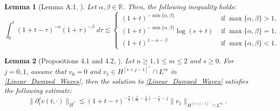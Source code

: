 \documentclass[11pt,reqno]{amsart}
\newtheorem{lemma}{Lemma}[section]
\begin{document}
\begin{lemma}[Lemma A.1, \cite{Dao2019}] \label{prop_Integral inequality}
Let $\alpha, \beta \in \mathbb{R}$. Then, the following inequality holds:
$$
\int_{0}^{t}(1+t-\tau)^{-\alpha}(1+\tau)^{-\beta} \; d \tau \lesssim \begin{cases}(1+t)^{-\min \{\alpha, \beta\}} & \text { if } \max \{\alpha, \beta\}>1, \\ (1+t)^{-\min \{\alpha, \beta\}} \log (e+t) & \text { if } \max \{\alpha, \beta\}=1, \\ (1+t)^{1-\alpha-\beta} & \text { if } \max \{\alpha, \beta\}<1.
\end{cases}
$$
\end{lemma}
\begin{lemma}[Propositions 4.1 and 4.2, \cite{DAbbicco2017}] \label{lemma:1.3}
Let $n \geq 1, 1 \leq m \leq 2$ and $s \geq 0$. For $j=0,1$, assume that $v_0=0$ and $v_1\in H^{[s+j-1]^+} \cap L^m$ in \eqref{Linear_Damped_Waves}, then the solution to \eqref{Linear_Damped_Waves} satisfies the following estimate:
$$
\big\|\partial_t^j v(t, \cdot)\big\|_{\dot{H}^s} \lesssim (1+t-\tau)^{-\frac{n}{2}\left(\frac{1}{m}-\frac{1}{2}\right)-\frac{s}{2}-j} \|v_1\|_{H^{[s+j-1]^+} \cap L^m}. $$
\end{lemma}
\end{document}
